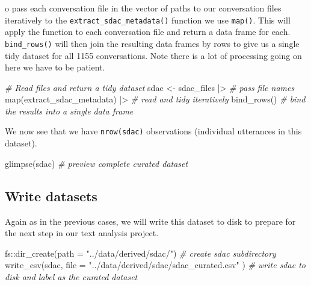 \documentclass[
  letterpaper,
  DIV=11,
  numbers=noendperiod]{scrreport}
\newenvironment{Shaded}{\begin{snugshade}}{\end{snugshade}}
\newcommand{\AttributeTok}[1]{\textcolor[rgb]{0.00,0.00,0.00}{#1}}
\newcommand{\CommentTok}[1]{\textcolor[rgb]{0.00,0.00,0.00}{\textit{#1}}}
\newcommand{\FunctionTok}[1]{\textcolor[rgb]{0.00,0.00,0.00}{#1}}
\newcommand{\NormalTok}[1]{\textcolor[rgb]{0.00,0.00,0.00}{#1}}
\newcommand{\OtherTok}[1]{\textcolor[rgb]{0.00,0.00,0.00}{#1}}
\newcommand{\SpecialCharTok}[1]{\textcolor[rgb]{0.00,0.00,0.00}{#1}}
\newcommand{\StringTok}[1]{\textcolor[rgb]{0.00,0.00,0.00}{#1}}
\theoremstyle{definition}
\theoremstyle{remark}
\begin{document}
o pass each conversation file in the vector of paths to our conversation
files iteratively to the \texttt{extract\_sdac\_metadata()} function we
use \texttt{map()}. This will apply the function to each conversation
file and return a data frame for each. \texttt{bind\_rows()} will then
join the resulting data frames by rows to give us a single tidy dataset
for all 1155 conversations. Note there is a lot of processing going on
here we have to be patient.

\begin{Shaded}
\begin{Highlighting}[]
\CommentTok{\# Read files and return a tidy dataset}
\NormalTok{sdac }\OtherTok{\textless{}{-}}
\NormalTok{  sdac\_files }\SpecialCharTok{|\textgreater{}} \CommentTok{\# pass file names}
  \FunctionTok{map}\NormalTok{(extract\_sdac\_metadata) }\SpecialCharTok{|\textgreater{}} \CommentTok{\# read and tidy iteratively}
  \FunctionTok{bind\_rows}\NormalTok{() }\CommentTok{\# bind the results into a single data frame}
\end{Highlighting}
\end{Shaded}

We now see that we have \texttt{nrow(sdac)} observations (individual
utterances in this dataset).

\begin{Shaded}
\begin{Highlighting}[]
\FunctionTok{glimpse}\NormalTok{(sdac) }\CommentTok{\# preview complete curated dataset}
\end{Highlighting}
\end{Shaded}

\hypertarget{write-datasets}{%
\subsection{Write datasets}\label{write-datasets}}

Again as in the previous cases, we will write this dataset to disk to
prepare for the next step in our text analysis project.

\begin{Shaded}
\begin{Highlighting}[]
\NormalTok{fs}\SpecialCharTok{::}\FunctionTok{dir\_create}\NormalTok{(}\AttributeTok{path =} \StringTok{"../data/derived/sdac/"}\NormalTok{) }\CommentTok{\# create sdac subdirectory}
\FunctionTok{write\_csv}\NormalTok{(sdac,}
  \AttributeTok{file =} \StringTok{"../data/derived/sdac/sdac\_curated.csv"}
\NormalTok{) }\CommentTok{\# write sdac to disk and label as the curated dataset}
\end{Highlighting}
\end{Shaded}
\end{document}
